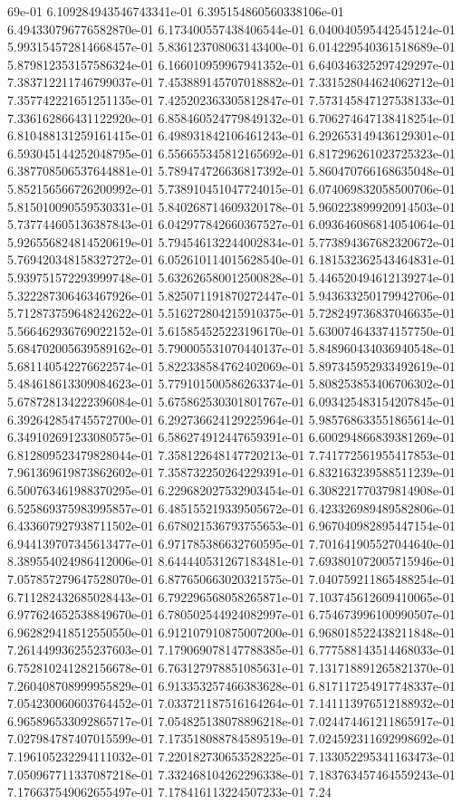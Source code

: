69e-01	6.109284943546743341e-01	6.395154860560338106e-01	6.494330796776582870e-01	6.173400557438406544e-01	6.040040595442545124e-01	5.993154572814668457e-01	5.836123708063143400e-01	6.014229540361518689e-01	5.879812353157586324e-01	6.166010959967941352e-01	6.640346325297429297e-01	7.383712211746799037e-01	7.453889145707018882e-01	7.331528044624062712e-01	7.357742221651251135e-01	7.425202363305812847e-01	7.573145847127538133e-01	7.336162866431122920e-01	6.858460524779849132e-01	6.706274647138418254e-01	6.810488131259161415e-01	6.498931842106461243e-01	6.292653149436129301e-01	6.593045144252048795e-01	6.556655345812165692e-01	6.817296261023725323e-01	6.387708506537644881e-01	5.789474726636817392e-01	5.860470766168635048e-01	5.852156566726200992e-01	5.738910451047724015e-01	6.074069832058500706e-01	5.815010090559530331e-01	5.840268714609320178e-01	5.960223899920914503e-01	5.737744605136387843e-01	6.042977842660367527e-01	6.093646086814054064e-01	5.926556824814520619e-01	5.794546132244002834e-01	5.773894367682320672e-01	5.769420348158327272e-01	6.052610114015628540e-01	6.181532362543464831e-01	5.939751572293999748e-01	5.632626580012500828e-01	5.446520494612139274e-01	5.322287306463467926e-01	5.825071191870272447e-01	5.943633250179942706e-01	5.712873759648242622e-01	5.516272804215910375e-01	5.728249736837046635e-01	5.566462936769022152e-01	5.615854525223196170e-01	5.630074643374157750e-01	5.684702005639589162e-01	5.790005531070440137e-01	5.848960434036940548e-01	5.681140542276622574e-01	5.822338584762402069e-01	5.897345952933492619e-01	5.484618613309084623e-01	5.779101500586263374e-01	5.808253853406706302e-01	5.678728134222396084e-01	5.675862530301801767e-01	6.093425483154207845e-01	6.392642854745572700e-01	6.292736624129225964e-01	5.985768633551865614e-01	6.349102691233080575e-01	6.586274912447659391e-01	6.600294866839381269e-01	6.812809523479828044e-01	7.358122648147720213e-01	7.741772561955417853e-01	7.961369619873862602e-01	7.358732250264229391e-01	6.832163239588511239e-01	6.500763461988370295e-01	6.229682027532903454e-01	6.308221770379814908e-01	6.525869375983995857e-01	6.485155219339505672e-01	6.423326989489582806e-01	6.433607927938711502e-01	6.678021536793755653e-01	6.967040982895447154e-01	6.944139707345613477e-01	6.971785386632760595e-01	7.701641905527044640e-01	8.389554024986412006e-01	8.644440531267183481e-01	7.693801072005715946e-01	7.057857279647528070e-01	6.877650663020321575e-01	7.040759211865488254e-01	6.711282432685028443e-01	6.792296568058265871e-01	7.103745612609410065e-01	6.977624652538849670e-01	6.780502544924082997e-01	6.754673996100990507e-01	6.962829418512550550e-01	6.912107910875007200e-01	6.968018522438211848e-01	7.261449936255237603e-01	7.179069078147788385e-01	6.777588143514468033e-01	6.752810241282156678e-01	6.763127978851085631e-01	7.131718891265821370e-01	7.260408708999955829e-01	6.913353257466383628e-01	6.817117254917748337e-01	7.054230060603764452e-01	7.033721187516164264e-01	7.141113976512188932e-01	6.965896533092865717e-01	7.054825138078896218e-01	7.024474461211865917e-01	7.027984787407015599e-01	7.173518088784589519e-01	7.024592311692998692e-01	7.196105232294111032e-01	7.220182730653528225e-01	7.133052295341163473e-01	7.050967711337087218e-01	7.332468104262296338e-01	7.183763457464559243e-01	7.176637549062655497e-01	7.178416113224507233e-01	7.24